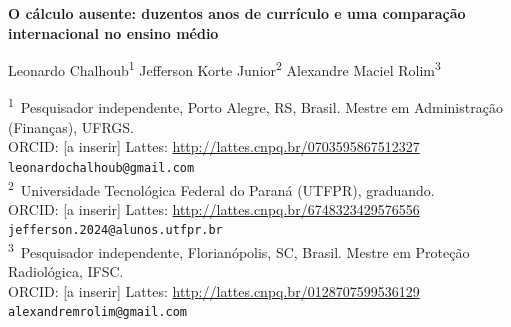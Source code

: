 \documentclass[12pt,a4paper,oneside]{article}
\begin{document}
\begin{center}
{\fontsize{14}{17}\selectfont\bfseries O cálculo ausente: duzentos anos de
currículo e uma comparação internacional no ensino médio}
\end{center}

\vspace{6pt}

\begin{center}
{\large Leonardo Chalhoub\textsuperscript{1} \quad\textbullet\quad
Jefferson Korte Junior\textsuperscript{2} \quad\textbullet\quad
Alexandre Maciel Rolim\textsuperscript{3}}\\[8pt]
\begin{minipage}{0.93\textwidth}\centering\footnotesize
\textsuperscript{1}~Pesquisador independente, Porto Alegre, RS, Brasil.
Mestre em Administração (Finanças), UFRGS.\\
ORCID: [a inserir] \textbullet{} Lattes: \url{http://lattes.cnpq.br/0703595867512327}
\textbullet{} \texttt{leonardochalhoub@gmail.com}\\[3pt]
\textsuperscript{2}~Universidade Tecnológica Federal do Paraná (UTFPR), graduando.\\
ORCID: [a inserir] \textbullet{} Lattes: \url{http://lattes.cnpq.br/6748323429576556}
\textbullet{} \texttt{jefferson.2024@alunos.utfpr.br}\\[3pt]
\textsuperscript{3}~Pesquisador independente, Florianópolis, SC, Brasil.
Mestre em Proteção Radiológica, IFSC.\\
ORCID: [a inserir] \textbullet{} Lattes: \url{http://lattes.cnpq.br/0128707599536129}
\textbullet{} \texttt{alexandremrolim@gmail.com}
\end{minipage}
\end{center}

\vspace{4pt}
\end{document}
